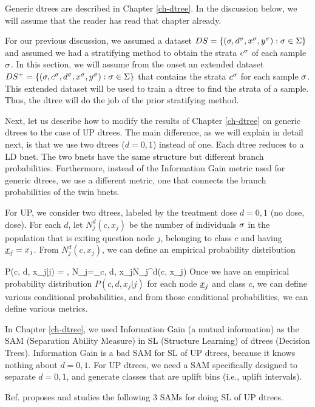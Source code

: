 Generic dtrees are 
described in Chapter \ref{ch-dtree}.
In the discussion below, we will assume that the reader has read
that chapter already.

For our previous discussion,
we assumed a dataset 
$DS= \{ (\sigma, d^\sigma, x^\sigma, y^\sigma):
 \sigma\in\Sigma\}$ and 
 assumed we had a stratifying
 method to obtain the strata
 $c^\sigma$ of each sample $\sigma$.
In this section, we will assume 
from the onset an
extended dataset
$DS^+= \{ (\sigma, c^\sigma, d^\sigma, x^\sigma, y^\sigma):
 \sigma\in\Sigma\}$
that contains the strata $c^\sigma$ for each sample $\sigma$.
This extended dataset will be used
to train a dtree to find the strata of
a sample. Thus, the dtree will
do the job of the prior stratifying method.

Next,
let us describe how to
modify the results
of Chapter \ref{ch-dtree}
on generic dtrees
to the case of UP dtrees.
The main difference,
as we will
explain in detail
next,
is that we use two dtrees ($d=0,1$) instead 
of one. Each dtree reduces to a LD bnet. The two
bnets have the same structure but
different branch probabilities.
Furthermore, instead of the Information
Gain metric
used for generic dtrees,
we use a different
metric, one 
that connects the branch probabilities
of the twin bnets.

For UP, we consider two dtrees,
labeled by the treatment dose $d=0,1$ (no dose, dose). 
For each $d$, let $N_j^d(c, x_j)$ be the number
of individuals $\sigma$
in the population that is exiting question node $j$,
belonging to class $c$ and having $\rvx_j=x_j$.
From $N_j^d(c, x_j)$, we can define 
an empirical
probability distribution 

\beq
P(c, d, x_j|j)
=
\;,\;\; 
N_j=\sum_{c, d, x_j}N_j^d(c, x_j)
\eeq
Once
we have an empirical probability distribution
$P(c, d, x_j| j)$ for each node $\rvx_j$ and
class $c$,
we can define various conditional 
probabilities, and from those
conditional probabilities,
we can define various metrics.



In Chapter
\ref{ch-dtree},
we used Information 
Gain
(a mutual information)
as the SAM (Separation Ability Measure)
in
SL (Structure Learning) 
of dtrees (Decision Trees).
Information Gain
is a bad
SAM for SL of UP dtrees,
because it knows nothing about
 $d=0,1$.
For
UP dtrees,
we need a SAM specifically
designed to separate $d=0,1$, and generate 
classes that are
 uplift bins (i.e., uplift intervals).


Ref.\cite{jaros}
proposes and studies 
the following
3 SAMs 
for doing SL of UP dtrees.


